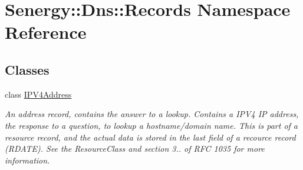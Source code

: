 \hypertarget{namespace_senergy_1_1_dns_1_1_records}{\section{Senergy\-:\-:Dns\-:\-:Records Namespace Reference}
\label{namespace_senergy_1_1_dns_1_1_records}
}
\subsection*{Classes}
\begin{DoxyCompactItemize}
\item 
class \hyperlink{class_senergy_1_1_dns_1_1_records_1_1_i_p_v4_address}{I\-P\-V4\-Address}
\begin{DoxyCompactList}\small\item\em An address record, contains the answer to a lookup. Contains a I\-P\-V4 I\-P address, the response to a question, to lookup a hostname/domain name. This is part of a resource record, and the actual data is stored in the last field of a recource record (R\-D\-A\-T\-E). See the Resource\-Class and section 3.. of R\-F\-C 1035 for more information. \end{DoxyCompactList}\end{DoxyCompactItemize}

